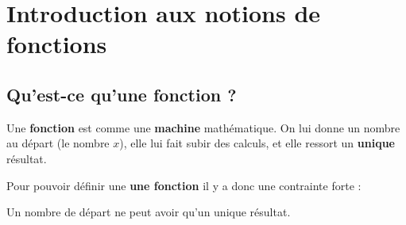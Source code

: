 \documentclass[a4paper]{book}
\begin{document}
\setcounter{chapter}{-1}
\renewcommand{\monTitre}{Introduction aux notions de fonctions}
\chapter{\monTitre}
\thispagestyle{fancy}

    \section{Qu'est-ce qu'une fonction ?}
    
    \begin{definition}
        Une \textbf{fonction} est comme une \textbf{machine} mathématique. 
        On lui donne un nombre au départ (le nombre $x$), elle lui fait subir des calculs, et elle ressort un \textbf{unique} résultat.
        
        Pour pouvoir définir une \textbf{une fonction} il y a donc une contrainte forte : 
        
        \begin{center}
            Un nombre de départ ne peut avoir qu'un unique résultat.
        \end{center}
    \end{definition}
    
\end{document}
